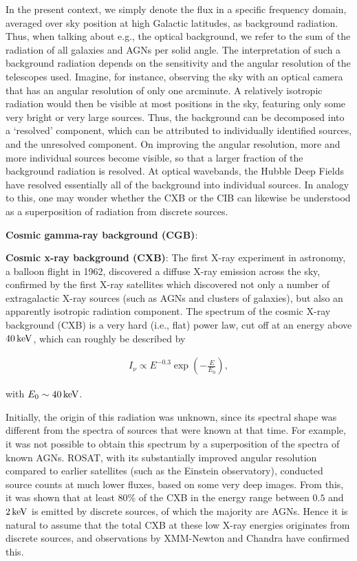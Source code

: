 \documentclass[a4paper,11pt]{article}
\begin{document}
{\noindent}In the present context, we simply denote the flux in a specific frequency domain, averaged over sky position at high Galactic latitudes, as background radiation. Thus, when talking about e.g., the optical background, we refer to the sum of the radiation of all galaxies and AGNs per solid angle. The interpretation of such a background radiation depends on the sensitivity and the angular resolution of the telescopes used. Imagine, for instance, observing the sky with an optical camera that has an angular resolution of only one arcminute. A relatively isotropic radiation would then be visible at most positions in the sky, featuring only some very bright or very large sources. Thus, the background can be decomposed into a `resolved' component, which can be attributed to individually identified sources, and the unresolved component. On improving the angular resolution, more and more individual sources become visible, so that a larger fraction of the background radiation is resolved. At optical wavebands, the Hubble Deep Fields have resolved essentially all of the background into individual sources. In analogy to this, one may wonder whether the CXB or the CIB can likewise be understood as a superposition of radiation from discrete sources.

{\noindent}\textbf{Cosmic gamma-ray background (CGB)}: 

{\noindent}\textbf{Cosmic x-ray background (CXB)}: The first X-ray experiment in astronomy, a balloon flight in 1962, discovered a diffuse X-ray emission across the sky, confirmed by the first X-ray satellites which discovered not only a number of extragalactic X-ray sources (such as AGNs and clusters of galaxies), but also an apparently isotropic radiation component. The spectrum of the cosmic X-ray background (CXB) is a very hard (i.e., flat) power law, cut off at an energy above $40\,{\rm keV}$, which can roughly be described by

\begin{align*}
    I_\nu \propto E^{-0.3}\exp\left(-\frac{E}{E_0}\right),
\end{align*}

{\noindent}with $E_0\sim40\,{\rm keV}$. 

{\noindent}Initially, the origin of this radiation was unknown, since its spectral shape was different from the spectra of sources that were known at that time. For example, it was not possible to obtain this spectrum by a superposition of the spectra of known AGNs. ROSAT, with its substantially improved angular resolution compared to earlier satellites (such as the Einstein observatory), conducted source counts at much lower fluxes, based on some very deep images. From this, it was shown that at least 80\% of the CXB in the energy range between $0.5$ and $2\,{\rm keV}$ is emitted by discrete sources, of which the majority are AGNs. Hence it is natural to assume that the total CXB at these low X-ray energies originates from discrete sources, and observations by XMM-Newton and Chandra have confirmed this.
\end{document}
